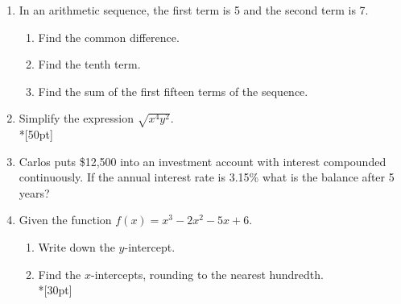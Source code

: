 \documentclass[12pt, oneside]{article}
\begin{document}

\vspace{1cm}

\begin{enumerate}


\item In an arithmetic sequence, the first term is 5 and the second term is 7.
\begin{enumerate}
    \item Find the common difference.
        \begin{flushright}[2]\end{flushright}
    \item Find the tenth term.\\[50pt]
        \begin{flushright}[2]\end{flushright}
    \item Find the sum of the first fifteen terms of the sequence. \\[50pt]
        \begin{flushright}[2]\end{flushright}
\end{enumerate}

\item Simplify the expression $\sqrt{x^4 y^2}$.\\*[50pt]
        \begin{flushright}[2]\end{flushright}

\item Carlos puts \$12,500 into an investment account with interest compounded continuously. If the annual interest rate is 3.15\% what is the balance after 5 years? %
        \begin{flushright}[5]\end{flushright}

\newpage
\item Given the function $f(x)=x^3-2x^2-5x+6$. 
\begin{enumerate}
    \item Write down the $y$-intercept.
        \begin{flushright}[1]\end{flushright}%
    \item Find the $x$-intercepts, rounding to the nearest hundredth.\\*[30pt]
        \begin{flushright}[2]\end{flushright}


\end{enumerate}
\end{enumerate}
\end{document}
